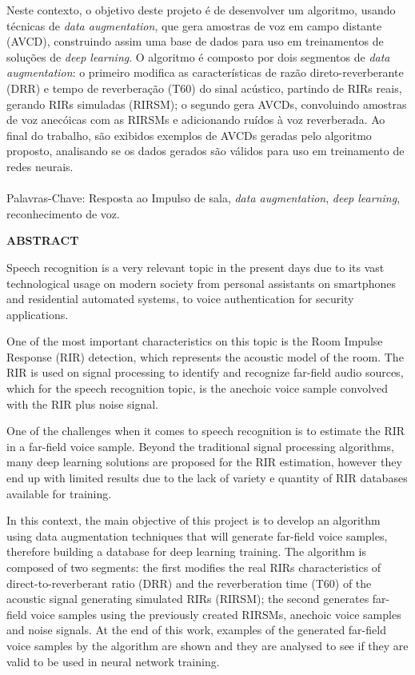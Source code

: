 Neste contexto, o objetivo deste projeto é de desenvolver um algoritmo, usando técnicas de \textit{data augmentation}, que gera amostras de voz
em campo distante (AVCD), construindo assim uma base de dados para uso em treinamentos de soluções de \textit{deep learning}. 
O algoritmo é composto por dois segmentos de \textit{data augmentation}: o primeiro modifica as características de razão direto-reverberante (DRR)
e tempo de reverberação (T60) do sinal acústico, partindo de RIRs reais, gerando RIRs simuladas (RIRSM);
o segundo gera AVCDs, convoluindo amostras de voz anecóicas com as RIRSMs e adicionando ruídos à voz reverberada. 
Ao final do trabalho, são exibidos exemplos de AVCDs geradas pelo algoritmo proposto, analisando se os dados gerados são válidos para uso 
em treinamento de redes neurais.

\paragraph{}
\noindent Palavras-Chave: Resposta ao Impulso de sala, \textit{data augmentation}, \textit{deep learning}, reconhecimento de voz.

\pagebreak


\begin{center}
\textbf{ABSTRACT}
\end{center}
      \vspace{0.5cm}

Speech recognition is a very relevant topic in the present days due to its vast technological usage on modern society
from personal assistants on smartphones and residential automated systems, to voice authentication for security applications.

One of the most important characteristics on this topic is the Room Impulse Response (RIR) detection, which represents the
acoustic model of the room. The RIR is used on signal processing to identify and recognize far-field audio sources,
which for the speech recognition topic, is the anechoic voice sample convolved with the RIR plus noise signal.

One of the challenges when it comes to speech recognition is to estimate the RIR in a far-field voice sample.
Beyond the traditional signal processing algorithms, many deep learning solutions are proposed for the RIR estimation,
however they end up with limited results due to the lack of variety e quantity of RIR databases available for training.

In this context, the main objective of this project is to develop an algorithm using data augmentation techniques that will
generate far-field voice samples, therefore building a database for deep learning training.
The algorithm is composed of two segments: the first modifies the real RIRs characteristics of direct-to-reverberant ratio (DRR) and
the reverberation time (T60) of the acoustic signal generating simulated RIRs (RIRSM);
the second generates far-field voice samples using the previously created RIRSMs, anechoic voice samples and noise signals.
At the end of this work, examples of the generated far-field voice samples by the algorithm are shown and they are analysed to see
if they are valid to be used in neural network training.

